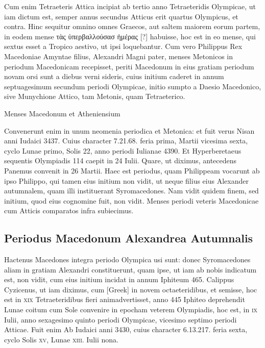 Cum enim Tetraeteris Attica
incipiat ab tertio anno Tetraeteridis Olympicae, ut iam dictum est, semper
annus secundus Atticus erit quartus Olympicus, et contra.
Hinc
sequitur omnino omnes Graecos, aut saltem maiorem eorum partem,
in eodem mense \textgreek{τὰς ὑπερβαλλούσασ ἡμέρας [?]}
 habuisse, hoc est in eo
mense, qui sextus esset a Tropico aestivo, ut ipsi loquebantur.
Cum
vero Philippus Rex Macedoniae Amyntae filius, Alexandri Magni
pater, menses Metonicos in periodum Macedonicam recepisset,
periti Macedonum in eius gratiam periodum novam orsi sunt a diebus
verni sideris, cuius initium caderet in annum septuagesimum
secundum periodi Olympicae, initio sumpto a Daesio Macedonico,
sive Munychione Attico, tam Metonis, quam Tetraeterico.
\begin{table}[htbp]
\centering

\caption{Menses Macedonum et Atheniensium}
\label{tab:menses_macedonum}
\end{table}
Convenerunt enim in unum neomenia periodica et
Metonica: et fuit verus Nisan anni Iudaici
3437.
Cuius character 7.21.68. feria prima,
Martii vicesima sexta, cyclo Lunae primo,
Solis 22, anno periodi Iulianae 4390.
Et
Hyperberetaeus sequentis Olympiadis 114
caepit in 24 Iulii.
Quare, ut diximus, antecedens
Panemus convenit in 26 Martii.
Haec
est periodus, quam Philippeam vocarunt ab
ipso Philippo, qui tamen eius initium non
vidit, ut neque filius eius Alexander autumnalem,
quam illi instituerant Syromacedones.
Nam vidit quidem finem, sed initium, quod eius cognomine fuit, non
vidit.
Menses periodi veteris Macedonicae cum Atticis comparatos
infra subiecimus.

\subsection{Periodus Macedonum Alexandrea Autumnalis}

Hactenus Macedones integra periodo Olympica usi sunt: donec
Syromacedones aliam in gratiam Alexandri constituerunt,
quam ipse, ut iam ab nobis indicatum est, non vidit, cum eius initium
incidat in annum Iphiteum 465.
Calippus Cyzicenus, ut iam
diximus, cum \textgreek{[Greek]} in novem octaeteridibus, et
semisse, hoc est in \textsc{xix} Tetraeteridibus fieri animadvertisset, anno 445
Iphiteo deprehendit Lunae coitum cum Sole convenire in epocham
veterem Olympiadis, hoc est, in \textsc{ix} Iulii, anno sexagesimo
 quinto periodi
Olympicae, vicesimo septimo periodi Atticae.
Fuit enim Ab Iudaici
anni 3430, cuius character 6.13.217. feria sexta, cyclo Solis \textsc{xv},
Lunae \textsc{xiii}. Iulii nona.


